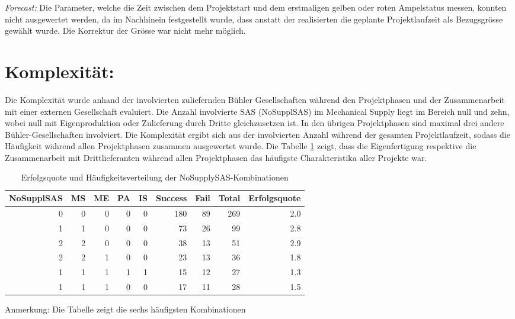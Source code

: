\textit{Forecast: }Die Parameter, welche die Zeit zwischen dem Projektstart und dem erstmaligen gelben oder roten Ampelstatus messen, konnten nicht ausgewertet werden, da im Nachhinein festgestellt wurde, dass anstatt der realisierten die geplante Projektlaufzeit als Bezugsgrösse gewählt wurde. Die Korrektur der Grösse war nicht mehr möglich.
\clearpage
\section{Komplexität:}
Die Komplexität wurde anhand der involvierten zuliefernden Bühler Gesellschaften während den Projektphasen und der Zusammenarbeit mit einer externen Gesellschaft evaluiert.
%
%
Die Anzahl involvierte SAS (NoSupplSAS) im Mechanical Supply liegt im Bereich null und zehn, wobei null mit Eigenproduktion oder Zulieferung durch Dritte gleichzusetzen ist. In den übrigen Projektphasen sind maximal drei andere Bühler-Gesellschaften involviert. Die Komplexität ergibt sich aus der involvierten Anzahl während der gesamten Projektlaufzeit, sodass die Häufigkeit während allen Projektphasen zusammen ausgewertet wurde. Die Tabelle \ref{tab:fnosas} zeigt, dass die Eigenfertigung respektive die Zusammenarbeit mit Drittlieferanten während allen Projektphasen das häufigste Charakteristika aller Projekte war. 
\begin{table}[H]
	\centering
	\begin{threeparttable}
	\caption{Erfolgsquote und Häufigkeitsverteilung der NoSupplySAS-Kombinationen}
	\begin{tabular}{lrrrrrrrr}
		\toprule
		\textbf{NoSupplSAS} & \multicolumn{1}{l}{\textbf{MS}} & \multicolumn{1}{l}{\textbf{ME}} & \multicolumn{1}{l}{\textbf{PA}} & \multicolumn{1}{l}{\textbf{IS}} & \multicolumn{1}{l}{\textbf{Success}} & \multicolumn{1}{l}{\textbf{Fail}} & \multicolumn{1}{l}{\textbf{Total}} & \multicolumn{1}{l}{\textbf{Erfolgsquote}} \\
		\midrule
		\multicolumn{1}{r}{0} & 0     & 0     & 0     & 0     & 180   & 89    & 269 & 2.0 \\
		\multicolumn{1}{r}{1} & 1     & 0     & 0     & 0     & 73    & 26    & 99  & 2.8 \\
		\multicolumn{1}{r}{2} & 2     & 0     & 0     & 0     & 38    & 13    & 51  & 2.9 \\
		\multicolumn{1}{r}{2} & 2     & 1     & 0     & 0     & 23    & 13    & 36  & 1.8 \\
		\multicolumn{1}{r}{1} & 1     & 1     & 1     & 1     & 15    & 12    & 27  & 1.3 \\
		\multicolumn{1}{r}{1} & 1     & 1     & 0     & 0     & 17    & 11    & 28  & 1.5 \\ 
		\bottomrule
	\end{tabular}%
	\begin{tablenotes}
	\small
	\item Anmerkung: Die Tabelle zeigt die sechs häufigsten Kombinationen
	\end{tablenotes}
\label{tab:fnosas}%
\end{threeparttable}
\end{table}%

